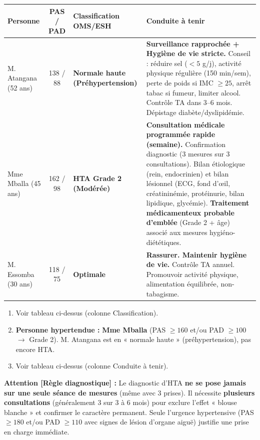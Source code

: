 \documentclass[11pt]{article}
\begin{document}
\begin{corrige}
\begin{center}
\begin{tabularx}{\linewidth}{|l|c|X|X|}\hline
\rowcolor{popblueL}
\textbf{Personne} & \textbf{PAS / PAD} & \textbf{Classification OMS/ESH} & \textbf{Conduite à tenir} \\ \hline
M. Atangana (52 ans) & 138 / 88 & \textbf{Normale haute (Préhypertension)} & \textbf{Surveillance rapprochée + Hygiène de vie stricte.} Conseil : réduire sel ($< 5$ g/j), activité physique régulière (150 min/sem), perte de poids si IMC $\ge 25$, arrêt tabac si fumeur, limiter alcool. Contrôle TA dans 3--6 mois. Dépistage diabète/dyslipidémie. \\ \hline
Mme Mballa (45 ans) & 162 / 98 & \textbf{HTA Grade 2 (Modérée)} & \textbf{Consultation médicale programmée rapide (semaine).} Confirmation diagnostic (3 mesures sur 3 consultations). Bilan étiologique (rein, endocrinien) et bilan lésionnel (ECG, fond d'œil, créatininémie, protéinurie, bilan lipidique, glycémie). \textbf{Traitement médicamenteux probable d'emblée} (Grade 2 + âge) associé aux mesures hygiéno-diététiques. \\ \hline
M. Essomba (30 ans) & 118 / 75 & \textbf{Optimale} & \textbf{Rassurer. Maintenir hygiène de vie.} Contrôle TA annuel. Promouvoir activité physique, alimentation équilibrée, non-tabagisme. \\ \hline
\end{tabularx}
\end{center}
\begin{enumerate}
    \item Voir tableau ci-dessus (colonne Classification).
    \item \textbf{Personne hypertendue :} \textbf{Mme Mballa} (PAS $\ge 160$ et/ou PAD $\ge 100$ $\to$ Grade 2). M. Atangana est en « normale haute » (préhypertension), pas encore HTA.
    \item Voir tableau ci-dessus (colonne Conduite à tenir).
\end{enumerate}
\par\textbf{Attention [Règle diagnostique] :} Le diagnostic d'HTA \textbf{ne se pose jamais sur une seule séance de mesures} (même avec 3 prises). Il nécessite \textbf{plusieurs consultations} (généralement 3 sur 3 à 6 mois) pour exclure l'effet « blouse blanche » et confirmer le caractère permanent. Seule l'urgence hypertensive (PAS $\ge 180$ et/ou PAD $\ge 110$ avec signes de lésion d'organe aiguë) justifie une prise en charge immédiate.
\end{corrige}
\end{document}
